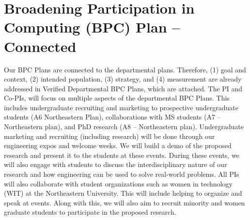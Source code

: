 
\section*{Broadening Participation in Computing (BPC) Plan – Connected}

Our BPC Plans are connected to the departmental plans. Therefore, (1) goal and
context, (2) intended population, (3) strategy, and (4) measurement are already
addressed in Verified Departmental BPC Plans, which are attached. The PI and
Co-PIs, will focus on multiple aspects of the departmental BPC Plans. This
includes undergraduate recruiting and marketing to prospective undergraduate
students (A6 Northeastern Plan), collaborations with MS students (A7 –
Northeastern plan), and PhD research (A8 – Northeastern plan). Undergraduate
marketing and recruiting (including research) will be done through our
engineering expos and welcome weeks. We will build a demo of the proposed
research and present it to the students at these events. During these events,
we will also engage with students to discuss the interdisciplinary nature of
our research and how engineering can be used to solve real-world problems.  All
PIs will also collaborate with student organizations such as women in
technology (WIT) at the Northeastern University. This will include helping to
organize and speak at events. Along with this, we will also aim to recruit
minority and women graduate students to participate in the proposed research.


